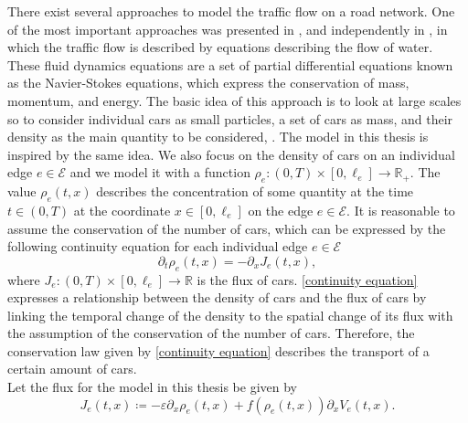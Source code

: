 There exist several approaches to model the traffic flow on a road network. One of the most important approaches was presented in \cite{LighthillWhitham:1955}, and independently in \cite{Richards:1956}, in which the traffic flow is described by equations describing the flow of water. These fluid dynamics equations are a set of partial differential equations known as the Navier-Stokes equations, which express the conservation of mass, momentum, and energy. The basic idea of this approach is to look at large scales so to consider individual cars as small particles, a set of cars as mass, and their density as the main quantity to be considered, \cite[p.~1]{GaravelloPiccoli:2006}. The model in this thesis is inspired by the same idea. We also focus on the density of cars on an individual edge $e \in \mathcal{E}$ and we model it with a function $\rho_e \colon  \left( 0, T \right)  \times \left[ 0, \ell_e \right] \to \mathbb{R}_{+}$. The value $\rho_e  \left( t,x \right) $ describes the concentration of some quantity at the time $t \in  \left( 0, T \right) $ at the coordinate $x \in \left[ 0, \ell_e \right]$ on the edge $e \in \mathcal{E}$. It is reasonable to assume the conservation of the number of cars, which can be expressed by the following continuity equation for each individual edge $e \in \mathcal{E}$
\begin{equation}
    \label{continuity equation}
    \partial_t \rho_e  \left( t,x \right)  = - \partial_x J_e \left( t,x \right) ,
\end{equation}
where $J_e \colon  \left( 0,T \right)  \times \left[ 0, \ell_e \right] \to \mathbb{R}$ is the flux of cars. \cref{continuity equation} expresses a relationship between the density of cars and the flux of cars by linking the temporal change of the density to the spatial change of its flux with the assumption of the conservation of the number of cars. Therefore, the conservation law given by \cref{continuity equation} describes the transport of a certain amount of cars. \\
Let the flux for the model in this thesis be given by 
\begin{equation} 
    \label{eq:flux} 
    J_e \left( t,x \right)  \coloneqq - \varepsilon \partial_x \rho_e  \left( t, x \right)  + f \left( \rho_e \left( t, x \right)  \right)  \partial_x V_e \left( t, x \right) .
\end{equation}

